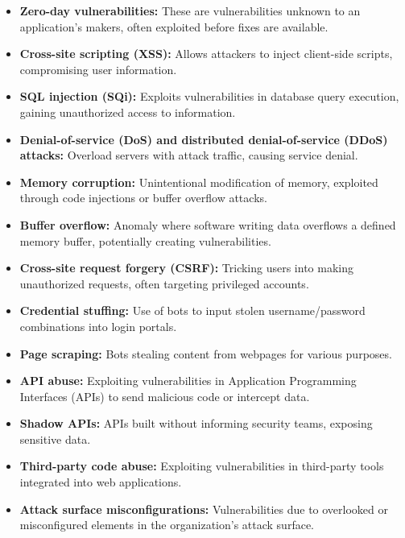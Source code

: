 \documentclass[conference]{IEEEtran}
\begin{document}
\begin{itemize}
    \item \textbf{Zero-day vulnerabilities:} These are vulnerabilities unknown to an application’s makers, often exploited before fixes are available.
    
    \item \textbf{Cross-site scripting (XSS):} Allows attackers to inject client-side scripts, compromising user information.
    
    \item \textbf{SQL injection (SQi):} Exploits vulnerabilities in database query execution, gaining unauthorized access to information.
    
    \item \textbf{Denial-of-service (DoS) and distributed denial-of-service (DDoS) attacks:} Overload servers with attack traffic, causing service denial.
    
    \item \textbf{Memory corruption:} Unintentional modification of memory, exploited through code injections or buffer overflow attacks.
    
    \item \textbf{Buffer overflow:} Anomaly where software writing data overflows a defined memory buffer, potentially creating vulnerabilities.
    
    \item \textbf{Cross-site request forgery (CSRF):} Tricking users into making unauthorized requests, often targeting privileged accounts.
    
    \item \textbf{Credential stuffing:} Use of bots to input stolen username/password combinations into login portals.
    
    \item \textbf{Page scraping:} Bots stealing content from webpages for various purposes.
    
    \item \textbf{API abuse:} Exploiting vulnerabilities in Application Programming Interfaces (APIs) to send malicious code or intercept data.
    
    \item \textbf{Shadow APIs:} APIs built without informing security teams, exposing sensitive data.
    
    \item \textbf{Third-party code abuse:} Exploiting vulnerabilities in third-party tools integrated into web applications.
    
    \item \textbf{Attack surface misconfigurations:} Vulnerabilities due to overlooked or misconfigured elements in the organization’s attack surface.
\end{itemize}
\end{document}
